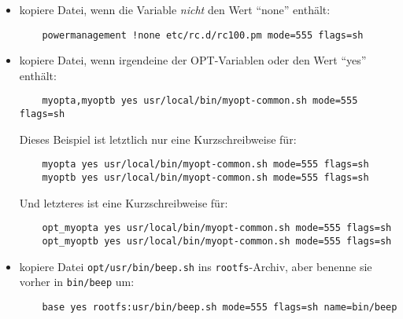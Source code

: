 \begin{itemize}
    \item kopiere Datei, wenn die Variable  \emph{nicht}
    den Wert "`none"' enthält:

\begin{example}
\begin{verbatim}
    powermanagement !none etc/rc.d/rc100.pm mode=555 flags=sh
\end{verbatim}
\end{example}

    \item kopiere Datei, wenn irgendeine der OPT-Variablen 
    oder  den Wert "`yes"' enthält:

\begin{example}
\begin{verbatim}
    myopta,myoptb yes usr/local/bin/myopt-common.sh mode=555 flags=sh
\end{verbatim}
\end{example}

    Dieses Beispiel ist letztlich nur eine Kurzschreibweise für:

\begin{example}
\begin{verbatim}
    myopta yes usr/local/bin/myopt-common.sh mode=555 flags=sh
    myoptb yes usr/local/bin/myopt-common.sh mode=555 flags=sh
\end{verbatim}
\end{example}

    Und letzteres ist eine Kurzschreibweise für:

\begin{example}
\begin{verbatim}
    opt_myopta yes usr/local/bin/myopt-common.sh mode=555 flags=sh
    opt_myoptb yes usr/local/bin/myopt-common.sh mode=555 flags=sh
\end{verbatim}
\end{example}

    \item kopiere Datei \texttt{opt/usr/bin/beep.sh} ins \texttt{rootfs}-Archiv,
    aber benenne sie vorher in \texttt{bin/beep} um:

\begin{example}
\begin{verbatim}
    base yes rootfs:usr/bin/beep.sh mode=555 flags=sh name=bin/beep
\end{verbatim}
\end{example}

    \end{itemize}


